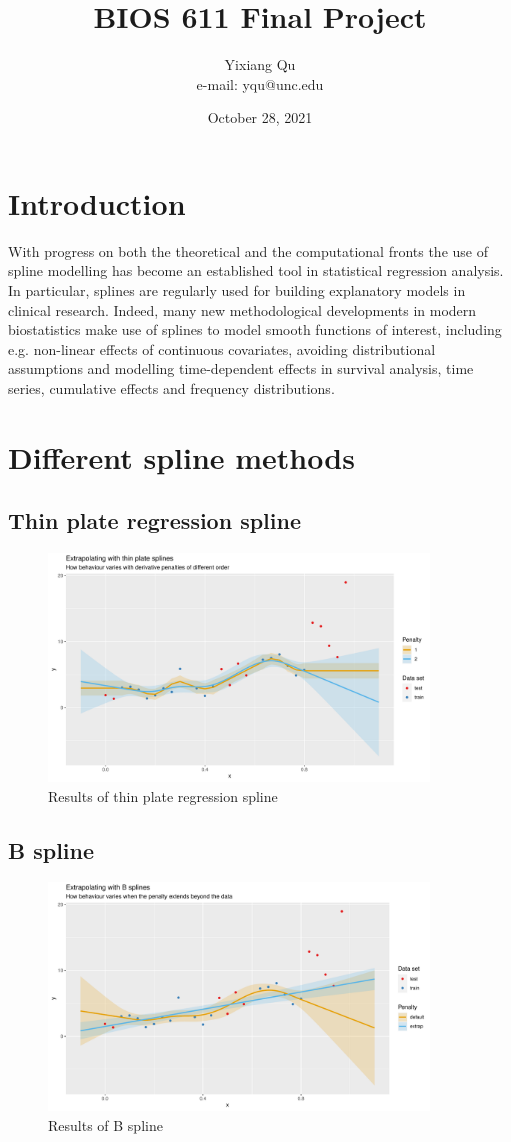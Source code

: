 \documentclass{article}
\begin{document}
\title{BIOS 611 Final Project}
\author{Yixiang Qu \\ e-mail: yqu@unc.edu}
\date{October 28, 2021}
\maketitle

\section{Introduction}
With progress on both the theoretical and the computational fronts the use of spline modelling has become an established tool in statistical regression analysis. In particular, splines are regularly used for building explanatory models in clinical research. Indeed, many new methodological developments in modern biostatistics make use of splines to model smooth functions of interest, including e.g. non-linear effects of continuous covariates, avoiding distributional assumptions and modelling time-dependent effects in survival analysis, time series, cumulative effects and frequency distributions.
\section{Different spline methods}
\subsection{Thin plate regression spline}
\begin{figure}[h]
    \centering
    \includegraphics[width=0.9\textwidth]{figure/tprs.pdf}
    \caption{Results of thin plate regression spline}
    \label{tprs}
    \end{figure}

\subsection{B spline}
\begin{figure}[h]
    \centering
    \includegraphics[width=0.9\textwidth]{figure/B_spline.pdf}
    \caption{Results of B spline}
    \label{bs}
    \end{figure}
\end{document}
